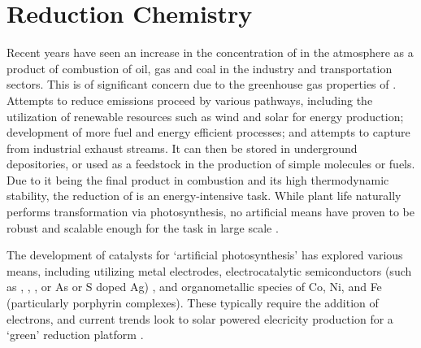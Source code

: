 \section{ Reduction Chemistry}

Recent years have seen an increase in the concentration of  in the atmosphere as a product of combustion of oil, gas and coal in the industry and transportation sectors\autocite{song2006}. This is of significant concern due to the greenhouse gas properties of  \autocite{matthews2009, meinshausen2009}. Attempts to reduce emissions proceed by various pathways, including the utilization of renewable resources such as wind and solar for energy production\autocite{neuhoff2005}; development of more fuel and energy efficient processes; and attempts to capture  from industrial exhaust streams\autocite{peratitus2014, kadantsev2013, iremonger2011}. It can then be stored in underground depositories, or used as a feedstock in the production of simple molecules or fuels\autocite{leitner1996, olah2009, kang2012}. Due to it being the final product in combustion and its high thermodynamic stability, the reduction of  is an energy-intensive task\autocite{schwarz1989, morris2009}. While plant life naturally performs  transformation via photosynthesis, no artificial means have proven to be robust and scalable enough for the task in large scale \autocite{arakawa2001}. 

The development of catalysts for `artificial photosynthesis' has explored various means, including utilizing metal electrodes\autocite{li2010}, electrocatalytic semiconductors (such as , , , or As or S doped Ag)\autocite{inoue1971, lim2014} , and organometallic species of Co, Ni, and Fe (particularly porphyrin complexes)\autocite{fisher1980, tinnemans1984, beley1986, simonmanso2004, fujita1994, fujita1993, kimura1994, dhanasekaran1999, lacy2014}. These typically require the addition of electrons, and current trends look to solar powered elecricity production for a `green'  reduction platform\autocite{zeng2014} . 


